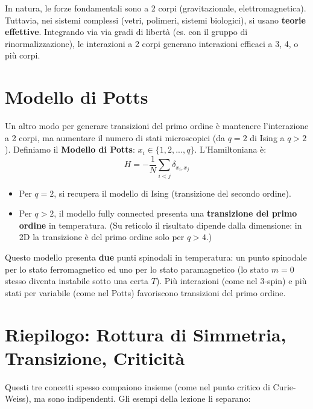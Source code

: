\bigskip
In natura, le forze fondamentali sono a 2 corpi (gravitazionale, elettromagnetica). Tuttavia, nei sistemi complessi (vetri, polimeri, sistemi biologici), si usano \textbf{teorie effettive}. Integrando via via gradi di libertà (es. con il gruppo di rinormalizzazione), le interazioni a 2 corpi generano interazioni efficaci a 3, 4, o più corpi.

\newpage
\section{Modello di Potts}

Un altro modo per generare transizioni del primo ordine è mantenere l'interazione a 2 corpi, ma aumentare il numero di stati microscopici (da $q=2$ di Ising a $q>2$).
Definiamo il \textbf{Modello di Potts}: $x_i \in \{1, 2, ..., q\}$.
L'Hamiltoniana è:
\begin{equation}
    H = -\frac{1}{N} \sum_{i<j} \delta_{x_i, x_j}
\end{equation}

\begin{itemize}
    \item Per $q=2$, si recupera il modello di Ising (transizione del secondo ordine).
    \item Per $q>2$, il modello fully connected presenta una \textbf{transizione del primo ordine} in temperatura. (Su reticolo il risultato dipende dalla dimensione: in 2D la transizione è del primo ordine solo per $q>4$.)
\end{itemize}
Questo modello presenta \textbf{due} punti spinodali in temperatura: un punto spinodale per lo stato ferromagnetico ed uno per lo stato paramagnetico (lo stato $m=0$ stesso diventa instabile sotto una certa $T$). Più interazioni (come nel 3-spin) e più stati per variabile (come nel Potts) favoriscono transizioni del primo ordine.

\section{Riepilogo: Rottura di Simmetria, Transizione, Criticità}

Questi tre concetti spesso compaiono insieme (come nel punto critico di Curie-Weiss), ma sono indipendenti. Gli esempi della lezione li separano:

